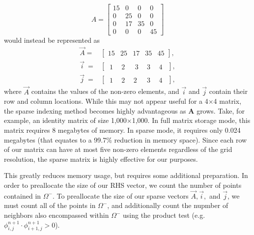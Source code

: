 \documentclass[oneside,12pt,final]{/Applications/TeX/packages/ucthesis-CA2012}
\begin{document}
\begin{mainmatter}
\dhalfsp
\begin{equation*}
A = 
\begin{bmatrix}
15 & 0 & 0 & 0\\
0 & 25 & 0 & 0\\
0 & 17 & 35 & 0\\
0 & 0 & 0 & 45
\end{bmatrix}
\end{equation*}
would instead be represented as
\begin{equation*}
\begin{aligned}
\vec{A} =&
\begin{bmatrix}
15 & 25 & 17 & 35 & 45
\end{bmatrix},\\
\vec{i} \>=&
\begin{bmatrix}
\> 1 &\>\> 2 &\>\>\> 3 &\>\> 3 &\>\> 4 \>\>
\end{bmatrix},\\
\vec{j} \>=&
\begin{bmatrix}
\> 1 &\>\> 2 &\>\> 2 & \>\>\>3 &\>\> 4 \>\>
\end{bmatrix},
\end{aligned}
\end{equation*}
\dsp
where $\vec{A}$ contains the values of the non-zero elements, and $\vec{i}$ and $\vec{j}$ contain their row and column locations. While this may not appear useful for a 4$\times$4 matrix, the sparse indexing method becomes highly advantageous as $\boldsymbol{A}$ grows. Take, for example, an identity matrix of size 1,000$\times$1,000. In full matrix storage mode, this matrix requires 8 megabytes of memory. In sparse mode, it requires only 0.024 megabytes (that equates to a 99.7\% reduction in memory space). Since each row of our matrix can have at most five non-zero elements regardless of the grid resolution, the sparse matrix is highly effective for our purposes.

This greatly reduces memory usage, but requires some additional preparation. In order to preallocate the size of our RHS vector, we count the number of points contained in $\Omega^-$. To preallocate the size of our sparse vectors $\vec{A}, \vec{i},$ and $\vec{j}$, we must count all of the points in  $\Omega^-$, and additionally count the nupmber of neighbors also encompassed within $\Omega^-$ using the product test (e.g. $\phi_{i,j}^{n+1} \cdot \phi_{i+1,j}^{n+1} > 0$).


\end{mainmatter}
\end{document}
